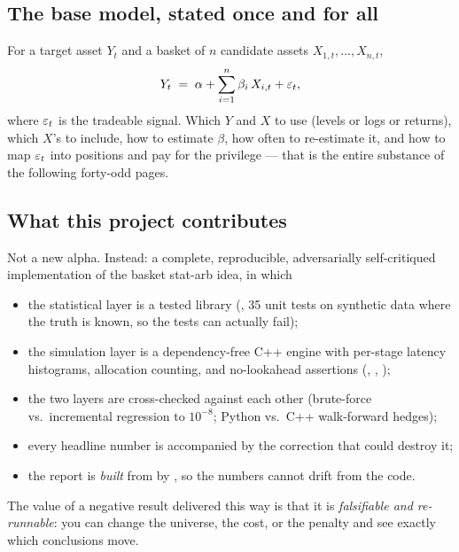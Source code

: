 \subsection{The base model, stated once and for all}
\label{sec:basemodel}

For a target asset $Y_t$ and a basket of $n$ candidate assets $X_{1,t},\dots,X_{n,t}$,
\begin{equation}
  Y_t \;=\; \alpha + \sum_{i=1}^{n}\beta_i\,X_{i,t} + \varepsilon_t ,
  \label{eq:basemodel}
\end{equation}
where $\varepsilon_t$ is the tradeable signal. Which $Y$ and $X$ to use (levels or logs or
returns), which $X$'s to include, how to estimate $\beta$, how often to re-estimate it,
and how to map $\varepsilon_t$ into positions and pay for the privilege --- that is the entire
substance of the following forty-odd pages.

\subsection{What this project contributes}
\label{sec:saa:contribution}

Not a new alpha. Instead: a complete, reproducible, adversarially self-critiqued
implementation of the basket stat-arb idea, in which
\begin{itemize}
  \item the statistical layer is a tested library (, 35 unit
    tests on synthetic data where the truth is known, so the tests can actually fail);
  \item the simulation layer is a dependency-free C++ engine with per-stage latency
    histograms, allocation counting, and no-lookahead assertions (,
    , );
  \item the two layers are cross-checked against each other (brute-force vs.\
    incremental regression to $10^{-8}$; Python vs.\ C++ walk-forward hedges);
  \item every headline number is accompanied by the correction that could destroy it;
  \item the report is \emph{built} from \code{results/} by
    , so the numbers cannot drift from the code.
\end{itemize}

The value of a negative result delivered this way is that it is \emph{falsifiable and
re-runnable}: you can change the universe, the cost, or the penalty and see exactly
which conclusions move.
